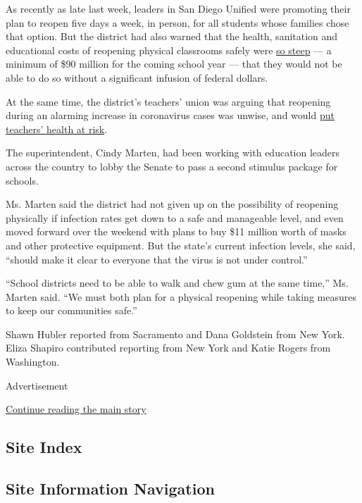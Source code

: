 As recently as late last week, leaders in San Diego Unified were
promoting their plan to reopen five days a week, in person, for all
students whose families chose that option. But the district had also
warned that the health, sanitation and educational costs of reopening
physical classrooms safely were
\href{https://www.nytimes3xbfgragh.onion/2020/07/09/us/schools-reopening-trump.html}{so
steep} --- a minimum of \$90 million for the coming school year --- that
they would not be able to do so without a significant infusion of
federal dollars.

At the same time, the district's teachers' union was arguing that
reopening during an alarming increase in coronavirus cases was unwise,
and would
\href{https://www.nytimes3xbfgragh.onion/2020/07/11/us/virus-teachers-classrooms.html}{put
teachers' health at risk}.

The superintendent, Cindy Marten, had been working with education
leaders across the country to lobby the Senate to pass a second stimulus
package for schools.

Ms. Marten said the district had not given up on the possibility of
reopening physically if infection rates get down to a safe and
manageable level, and even moved forward over the weekend with plans to
buy \$11 million worth of masks and other protective equipment. But the
state's current infection levels, she said, ``should make it clear to
everyone that the virus is not under control.''

``School districts need to be able to walk and chew gum at the same
time,'' Ms. Marten said. ``We must both plan for a physical reopening
while taking measures to keep our communities safe.''

Shawn Hubler reported from Sacramento and Dana Goldstein from New York.
Eliza Shapiro contributed reporting from New York and Katie Rogers from
Washington.

Advertisement

\protect\hyperlink{after-bottom}{Continue reading the main story}

\hypertarget{site-index}{%
\subsection{Site Index}\label{site-index}}

\hypertarget{site-information-navigation}{%
\subsection{Site Information
Navigation}\label{site-information-navigation}}


